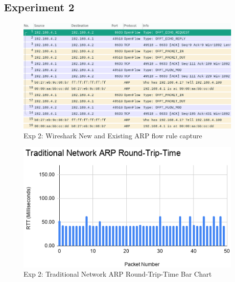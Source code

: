 \documentclass[12pt, oneside]{book}
\begin{document}
\subsection{Experiment 2}
\label{app:Exp2}

\begin{figure}[H]
	\centering
	\includegraphics[scale=0.42]{../tests/RTT/newflowrulefull.png}
	\caption{Exp 2: Wireshark New and Existing ARP flow rule capture}
	\label{app:rttcap}
\end{figure}

\begin{figure}[H]
	\centering
	\includegraphics[scale=0.7]{../tests/RTT/TARP_RTT.png}
	\caption{Exp 2: Traditional Network ARP Round-Trip-Time Bar Chart}
	\label{fig:tarprtt}
\end{figure}
\end{document}
